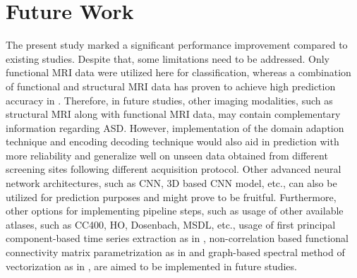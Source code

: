 \section{Future Work}
The present study marked a significant performance improvement compared to existing studies. Despite that, some limitations need to be addressed. Only functional MRI data were utilized here for classification, whereas a combination of functional and structural MRI data has proven to achieve high prediction accuracy in \cite{rakic2020improving, mellema2019multiple}. Therefore, in future studies, other imaging modalities, such as structural MRI along with functional MRI data, may contain complementary information regarding ASD. However, implementation of the domain adaption technique \cite{li_gu_dvornek_staib_ventola_duncan_2020} and encoding decoding technique \cite{du2019brain} would also aid in prediction with more reliability and generalize well on unseen data obtained from different screening sites following different acquisition protocol. Other advanced neural network architectures, such as CNN, 3D based CNN model, etc., can also be utilized for prediction purposes and might prove to be fruitful. Furthermore, other options for implementing pipeline steps, such as usage of other available atlases, such as CC400, HO, Dosenbach, MSDL, etc., usage of first principal component-based time series extraction as in \cite{yassin2020machine}, non-correlation based functional connectivity matrix parametrization as in \cite{venkatesh2020comparing} and graph-based spectral method of vectorization as in \cite{farahani2019application}, are aimed to be implemented in future studies.